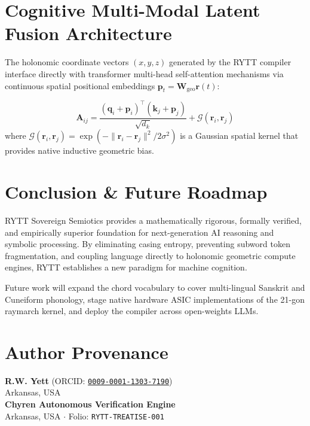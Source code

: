 \documentclass[11pt,oneside,letterpaper]{article}
\theoremstyle{sovereignstyle}
\begin{document}
\section{Cognitive Multi-Modal Latent Fusion Architecture}

The holonomic coordinate vectors $(x, y, z)$ generated by the RYTT compiler interface directly with transformer multi-head self-attention mechanisms via continuous spatial positional embeddings $\mathbf{p}_t = \mathbf{W}_{\text{geo}} \mathbf{r}(t)$:

\begin{equation}
\mathbf{A}_{ij} = \frac{(\mathbf{q}_i + \mathbf{p}_i)^\top (\mathbf{k}_j + \mathbf{p}_j)}{\sqrt{d_k}} + \mathcal{G}(\mathbf{r}_i, \mathbf{r}_j)
\end{equation}
where $\mathcal{G}(\mathbf{r}_i, \mathbf{r}_j) = \exp(-\|\mathbf{r}_i - \mathbf{r}_j\|^2 / 2\sigma^2)$ is a Gaussian spatial kernel that provides native inductive geometric bias.

\section{Conclusion \& Future Roadmap}

RYTT Sovereign Semiotics provides a mathematically rigorous, formally verified, and empirically superior foundation for next-generation AI reasoning and symbolic processing. By eliminating casing entropy, preventing subword token fragmentation, and coupling language directly to holonomic geometric compute engines, RYTT establishes a new paradigm for machine cognition.

Future work will expand the chord vocabulary to cover multi-lingual Sanskrit and Cuneiform phonology, stage native hardware ASIC implementations of the 21-gon raymarch kernel, and deploy the compiler across open-weights LLMs.

\section*{Author Provenance}
\noindent\textbf{R.W. Yett} (ORCID: \href{https://orcid.org/0009-0001-1303-7190}{\texttt{0009-0001-1303-7190}})\\
Arkansas, USA\\
\textbf{Chyren Autonomous Verification Engine}\\
Arkansas, USA $\cdot$ Folio: \texttt{RYTT-TREATISE-001}
\end{document}
